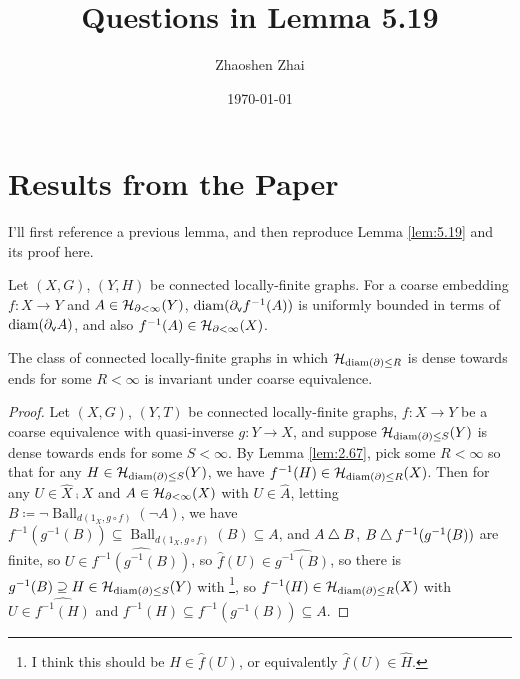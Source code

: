 \documentclass{amsart}
\begin{document}
    \title{Questions in Lemma 5.19}
    \author{Zhaoshen Zhai}
    \date{\today}
    \maketitle

    \newcommand{\Ball}{\operatorname{Ball}}

    \section{Results from the Paper}

    I'll first reference a previous lemma, and then reproduce Lemma \ref{lem:5.19} and its proof here.

    \setcounter{section}{2}
    \setcounter{theorem}{66}
    \begin{lemma}\label{lem:2.67}
        Let $(X,G)$, $(Y,H)$ be connected locally-finite graphs. For a coarse embedding $f:X\to Y$ and $A\in\mathcal{H}_{\partial<\infty}(Y)$, $\operatorname{diam}(\partial_{\textsf{v}}f^{-1}(A))$ is uniformly bounded in terms of $\operatorname{diam}(\partial_{\textsf{v}}A)$, and also $f^{-1}(A)\in\mathcal{H}_{\partial<\infty}(X)$.
    \end{lemma}

    \setcounter{section}{5}
    \setcounter{theorem}{18}
    \begin{lemma}\label{lem:5.19}
        The class of connected locally-finite graphs in which $\mathcal{H}_{\operatorname{diam}(\partial)\leq R}$ is dense towards ends for some $R<\infty$ is invariant under coarse equivalence.
    \end{lemma}
    \begin{proof}
        Let $(X,G)$, $(Y,T)$ be connected locally-finite graphs, $f:X\to Y$ be a coarse equivalence with quasi-inverse $g:Y\to X$, and suppose $\mathcal{H}_{\operatorname{diam}(\partial)\leq S}(Y)$ is dense towards ends for some $S<\infty$. By Lemma \ref{lem:2.67}, pick some $R<\infty$ so that for any $H\in\mathcal{H}_{\operatorname{diam}(\partial)\leq S}(Y)$, we have $f^{-1}(H)\in\mathcal{H}_{\operatorname{diam}(\partial)\leq R}(X)$. Then for any $U\in\widehat{X}\comp X$ and $A\in\mathcal{H}_{\partial<\infty}(X)$ with $U\in\widehat{A}$, letting $B\coloneqq\lnot\Ball_{d(1_X,g\circ f)}(\lnot A)$, we have $f^{-1}(g^{-1}(B))\subseteq\Ball_{d(1_X,g\circ f)}(B)\subseteq A$, and $A\bigtriangleup B$, $B\bigtriangleup f^{-1}(g^{-1}(B))$ are finite, so $U\in\widehat{f^{-1}(g^{-1}(B))}$, so $\widehat{f}(U)\in\widehat{g^{-1}(B)}$, so there is $g^{-1}(B)\supseteq H\in\mathcal{H}_{\operatorname{diam}(\partial)\leq S}(Y)$ with {}\footnote{I think this should be $H\in\widehat{f}(U)$, or equivalently $\widehat{f}(U)\in\widehat{H}$.}, so $f^{-1}(H)\in\mathcal{H}_{\operatorname{diam}(\partial)\leq R}(X)$ with $U\in\widehat{f^{-1}(H)}$ and $f^{-1}(H)\subseteq f^{-1}(g^{-1}(B))\subseteq A$.
    \end{proof}
\end{document}
